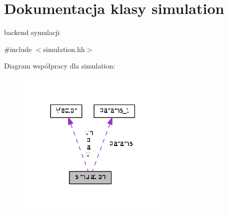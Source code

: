 \hypertarget{classsimulation}{}\section{Dokumentacja klasy simulation}
\label{classsimulation}


backend symulacji  




{\ttfamily \#include $<$simulation.\+hh$>$}



Diagram współpracy dla simulation\+:
\nopagebreak
\begin{figure}[H]
\begin{center}
\leavevmode
\includegraphics[width=206pt]{classsimulation__coll__graph}
\end{center}
\end{figure}
